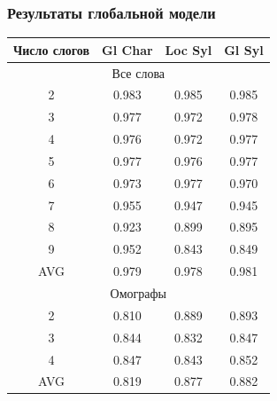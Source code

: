 \documentclass[russian]{beamer}
\begin{document}
\begin{frame}
\frametitle{Результаты глобальной модели}
\begin{table}[H]	
	\begin{small}
		\begin{center}
			\begin{tabular}{|c|c|c| c|}
				\hline
				Число слогов & Gl Char & Loc Syl & Gl Syl \\ \hline
							\multicolumn{4}{|c|}{Все слова}                          \\ \hline
				
				2       &       0.983       &      0.985      & 0.985  \\ \hline
				3       &       0.977       &      0.972      &   0.978 \\ \hline
				4       &       0.976       &      0.972      &   0.977 \\ \hline
				5       &       0.977       &      0.976      &  0.977 \\ \hline
				6       &       0.973       &      0.977      &  0.970 \\ \hline
				7       &       0.955       &      0.947      &  0.945 \\ \hline
				8       &       0.923       &      0.899      &  0.895 \\ \hline
				9       &       0.952       &      0.843      & 0.849 \\ \hline
				AVG    &       0.979       &      0.978      & 0.981 \\ \hline
							\multicolumn{4}{|c|}{Омографы}                          \\ \hline
				
				2       &       0.810       &      0.889      & 0.893\\ \hline
				3       &       0.844       &      0.832      & 0.847\\ \hline
				4       &       0.847       &      0.843      & 0.852\\ \hline
				AVG    &       0.819       &      0.877      & 0.882 \\ \hline
			\end{tabular}
		\end{center}
	\end{small}
\end{table}	
\end{frame}
\end{document}
